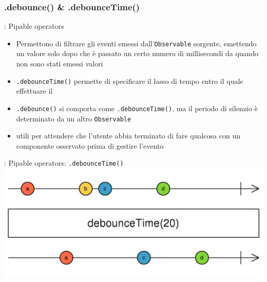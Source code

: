             \subsubsection{.debounce() \& .debounceTime()}\label{subsub:debounce}

            \begin{frame}{\insertsubsectionhead}{: Pipable operators}
                \begin{block}{\texttt{\insertsubsubsectionhead}}
                    \begin{itemize}
                        \item
                            Permettono di filtrare gli eventi emessi dall'\texttt{Observable} sorgente, emettendo un valore solo dopo che è passato un certo numero di millisecondi da quando non sono stati emessi valori
                        \item
                            \texttt{.debounceTime()} permette di specificare il lasso di tempo entro il quale effettuare il 
                        \item
                            \texttt{.debounce()} si comporta come \texttt{.debounceTime()}, ma il periodo di silenzio è determinato da un altro \texttt{Observable}
                        \item
                            utili per attendere che l'utente abbia terminato di fare qualcosa con un componente osservato prima di gestire l'evento
                    \end{itemize}
                \end{block}
            \end{frame}

            \begin{frame}[fragile]{\insertsubsectionhead}{: Pipable operators: \texttt{.debounceTime()}}
                \includegraphics[width=\linewidth]{debounceTime}
            \end{frame}

